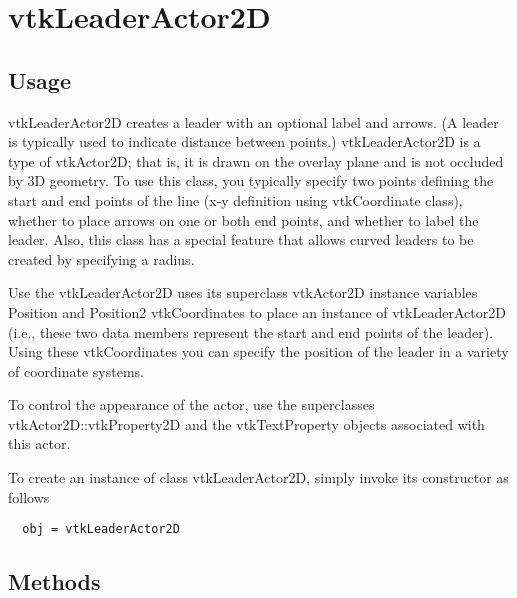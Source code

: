 \section{vtkLeaderActor2D}

\subsection{Usage}

 vtkLeaderActor2D creates a leader with an optional label and arrows. (A
 leader is typically used to indicate distance between points.)
 vtkLeaderActor2D is a type of vtkActor2D; that is, it is drawn on the
 overlay plane and is not occluded by 3D geometry. To use this class, you
 typically specify two points defining the start and end points of the line
 (x-y definition using vtkCoordinate class), whether to place arrows on one
 or both end points, and whether to label the leader. Also, this class has a
 special feature that allows curved leaders to be created by specifying a
 radius.

 Use the vtkLeaderActor2D uses its superclass vtkActor2D instance variables
 Position and Position2 vtkCoordinates to place an instance of
 vtkLeaderActor2D (i.e., these two data members represent the start and end
 points of the leader).  Using these vtkCoordinates you can specify the position
 of the leader in a variety of coordinate systems. 

 To control the appearance of the actor, use the superclasses
 vtkActor2D::vtkProperty2D and the vtkTextProperty objects associated with
 this actor.


To create an instance of class vtkLeaderActor2D, simply
invoke its constructor as follows
\begin{verbatim}
  obj = vtkLeaderActor2D
\end{verbatim}
\subsection{Methods}

